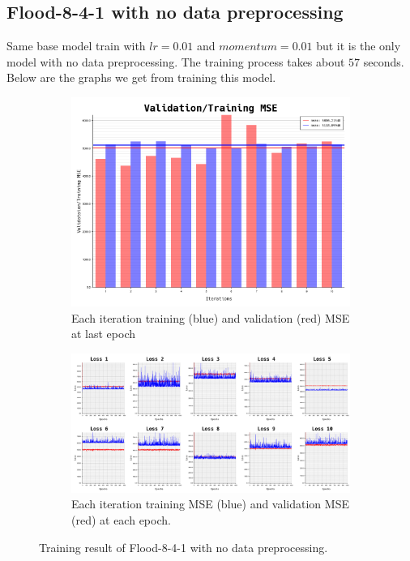 \documentclass{article}
\begin{document}
\newpage
\subsection*{Flood-8-4-1 with no data preprocessing}
Same base model train with $lr = 0.01$ and $momentum = 0.01$ but 
it is the only model with no data preprocessing. The training process takes about $57$ seconds.
Below are the graphs we get from training this model. 
\begin{figure}[ht]
	\begin{subfigure}{\textwidth}
		\centering
		\includegraphics[scale=0.3]{flood-8-4-1_4/cv_l}
		\caption{Each iteration training (blue) and validation (red) MSE at last epoch}
		\label{fig:5a}
	\end{subfigure}
	\begin{subfigure}{\textwidth}
		\includegraphics[width=\textwidth]{flood-8-4-1_4/loss}
		\caption{Each iteration training MSE (blue) and validation MSE (red) at each epoch.}
		\label{fig:5b}
	\end{subfigure}
	\caption{Training result of Flood-8-4-1 with no data preprocessing.}
	\label{fig:5}
\end{figure}
\FloatBarrier
\end{document}

